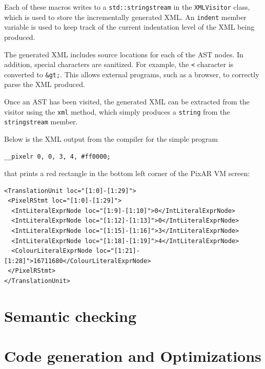 \documentclass[11pt,a4paper]{scrartcl}
\begin{document}
Each of these macros writes to a \verb!std::stringstream! in the \verb!XMLVisitor! class, which is used to store the incrementally generated XML. An \verb!indent! member variable is used to keep track of the current indentation level of the XML being produced.

The generated XML includes source locations for each of the AST nodes. In addition, special characters are sanitized. For example, the \verb!<! character is converted to \verb!&gt;!. This allows external programs, such as a browser, to correctly parse the XML produced.

Once an AST has been visited, the generated XML can be extracted from the visitor using the \verb!xml! method, which simply produces a \verb!string! from the \verb!stringstream! member.

Below is the XML output from the compiler for the simple program

\begin{verbatim}
__pixelr 0, 0, 3, 4, #ff0000;
\end{verbatim}

that prints a red rectangle in the bottom left corner of the PixAR VM screen:

\begin{verbatim}
<TranslationUnit loc="[1:0]-[1:29]">
 <PixelRStmt loc="[1:0]-[1:29]">
  <IntLiteralExprNode loc="[1:9]-[1:10]">0</IntLiteralExprNode>
  <IntLiteralExprNode loc="[1:12]-[1:13]">0</IntLiteralExprNode>
  <IntLiteralExprNode loc="[1:15]-[1:16]">3</IntLiteralExprNode>
  <IntLiteralExprNode loc="[1:18]-[1:19]">4</IntLiteralExprNode>
  <ColourLiteralExprNode loc="[1:21]-[1:28]">16711680</ColourLiteralExprNode>
 </PixelRStmt>
</TranslationUnit>
\end{verbatim}

\newpage

\section{Semantic checking}

\newpage

\section{Code generation and Optimizations}
\end{document}
